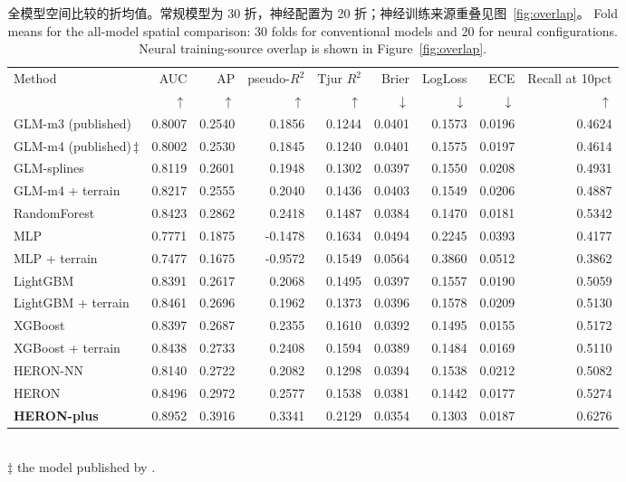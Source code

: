 \begin{table}[htbp]\centering\footnotesize
\caption{\ifzh
全模型空间比较的折均值。常规模型为 30 折，神经配置为 20 折；神经训练来源重叠见图~\ref{fig:overlap}。
\else
Fold means for the all-model spatial comparison: 30 folds for conventional models and 20 for neural configurations. Neural training-source overlap is shown in Figure~\ref{fig:overlap}.
\fi}\label{tab:bench}
\begin{adjustbox}{max width=\linewidth}
\begin{tabular}{lrrrrrrrr}\toprule
Method & AUC & AP & pseudo-$R^2$ & Tjur $R^2$ & Brier & LogLoss & ECE & Recall at 10pct \\
& $\uparrow$ & $\uparrow$ & $\uparrow$ & $\uparrow$ & $\downarrow$ & $\downarrow$ & $\downarrow$ & $\uparrow$ \\ \midrule
GLM-m3 (published) & 0.8007 & 0.2540 & 0.1856 & 0.1244 & 0.0401 & 0.1573 & 0.0196 & 0.4624 \\
GLM-m4 (published)\,$\ddagger$ & 0.8002 & 0.2530 & 0.1845 & 0.1240 & 0.0401 & 0.1575 & 0.0197 & 0.4614 \\
GLM-splines & 0.8119 & 0.2601 & 0.1948 & 0.1302 & 0.0397 & 0.1550 & 0.0208 & 0.4931 \\
GLM-m4 + terrain & 0.8217 & 0.2555 & 0.2040 & 0.1436 & 0.0403 & 0.1549 & 0.0206 & 0.4887 \\
RandomForest & 0.8423 & 0.2862 & 0.2418 & 0.1487 & 0.0384 & 0.1470 & 0.0181 & 0.5342 \\
MLP & 0.7771 & 0.1875 & -0.1478 & 0.1634 & 0.0494 & 0.2245 & 0.0393 & 0.4177 \\
MLP + terrain & 0.7477 & 0.1675 & -0.9572 & 0.1549 & 0.0564 & 0.3860 & 0.0512 & 0.3862 \\
LightGBM & 0.8391 & 0.2617 & 0.2068 & 0.1495 & 0.0397 & 0.1557 & 0.0190 & 0.5059 \\
LightGBM + terrain & 0.8461 & 0.2696 & 0.1962 & 0.1373 & 0.0396 & 0.1578 & 0.0209 & 0.5130 \\
XGBoost & 0.8397 & 0.2687 & 0.2355 & 0.1610 & 0.0392 & 0.1495 & 0.0155 & 0.5172 \\
XGBoost + terrain & 0.8438 & 0.2733 & 0.2408 & 0.1594 & 0.0389 & 0.1484 & 0.0169 & 0.5110 \\
HERON-NN & 0.8140 & 0.2722 & 0.2082 & 0.1298 & 0.0394 & 0.1538 & 0.0212 & 0.5082 \\
HERON & 0.8496 & 0.2972 & 0.2577 & 0.1538 & 0.0381 & 0.1442 & 0.0177 & 0.5274 \\
\textbf{HERON-plus} & 0.8952 & 0.3916 & 0.3341 & 0.2129 & 0.0354 & 0.1303 & 0.0187 & 0.6276 \\
\bottomrule\end{tabular}
\end{adjustbox}
\\[2pt]\footnotesize $\ddagger$ the model published by \cite{ortiz2026}.
\end{table}